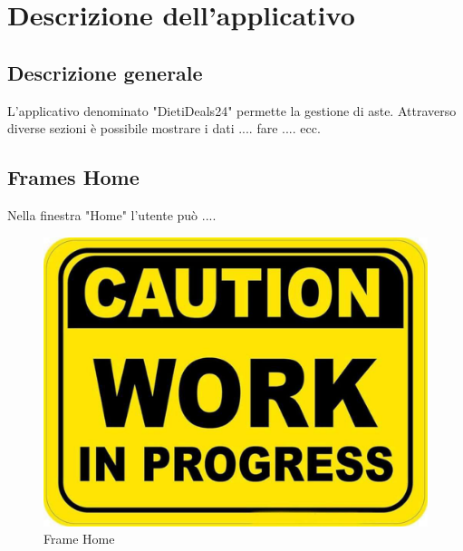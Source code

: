 \chapter{Descrizione dell'applicativo}
    \section{Descrizione generale}
        L'applicativo denominato "DietiDeals24" permette la gestione di aste. Attraverso diverse sezioni è possibile mostrare i dati .... fare .... ecc.

    \section{Frames Home}
        Nella finestra "Home" l'utente può ....
        \begin{figure}[htbp!]
            \centering
                \vspace{2\baselineskip}
                \includegraphics[width=\linewidth]{Immagini/WorkInProgress.pdf}
            \caption{Frame Home}
            \label{fig:Frame Home}
        \end{figure}